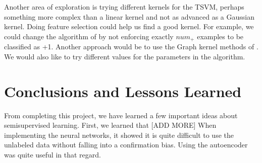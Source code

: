 \documentclass[11pt]{article}
\begin{document}
Another area of exploration is trying different kernels for the TSVM, perhaps something more complex than a linear kernel and not as advanced as a Gaussian kernel. Doing feature selection could help us find a good kernel. For example, we could change the algorithm of \cite{Joachims:1999} by not enforcing exactly $num_+$ examples to be classified as +1. Another approach would be to use the Graph kernel methods of \cite{smola2003kernels}. We would also like to try different values for the parameters in the algorithm.

\section{Conclusions and Lessons Learned}

From completing this project, we have learned a few important ideas about semisupervised learning. First, we learned that [ADD MORE] When implementing the neural networks, it showed it is quite difficult to use the unlabeled data without falling into a confirmation bias. Using the autoencoder was quite useful in that regard.



\end{document}
